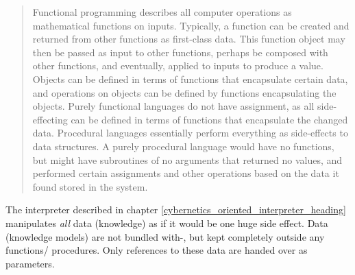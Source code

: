 \begin{quote}
    Functional programming describes all computer operations as mathematical
    functions on inputs. Typically, a function can be created and returned from
    other functions as first-class data. This function object may then be passed
    as input to other functions, perhaps be composed with other functions, and
    eventually, applied to inputs to produce a value. Objects can be defined in
    terms of functions that encapsulate certain data, and operations on objects
    can be defined by functions encapsulating the objects. Purely functional
    languages do not have assignment, as all side-effecting can be defined in
    terms of functions that encapsulate the changed data. Procedural languages
    essentially perform everything as side-effects to data structures. A purely
    procedural language would have no functions, but might have subroutines of
    no arguments that returned no values, and performed certain assignments and
    other operations based on the data it found stored in the system.
\end{quote}

The interpreter described in chapter \ref{cybernetics_oriented_interpreter_heading}
manipulates \emph{all} data (knowledge) as if it would be one huge side effect.
Data (knowledge models) are not bundled with-, but kept completely outside any
functions/ procedures. Only references to these data are handed over as
parameters.
